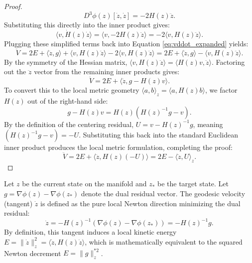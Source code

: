 \begin{proof}
\begin{equation}
    D^3\phi(z)[\dot{z}, \dot{z}] = -2H(z)\ddot{z}.
\end{equation}
Substituting this directly into the inner product gives:
\begin{equation}
    \langle v, \dot{H}(z)\dot{z} \rangle = \langle v, -2H(z)\ddot{z} \rangle = -2\langle v, H(z)\ddot{z} \rangle.
\end{equation}
Plugging these simplified terms back into Equation \ref{eq:vddot_expanded} yields:
\begin{equation}
    \ddot{V} = 2E + \langle \ddot{z}, g \rangle + \langle v, H(z)\ddot{z} \rangle - 2\langle v, H(z)\ddot{z} \rangle = 2E + \langle \ddot{z}, g \rangle - \langle v, H(z)\ddot{z} \rangle.
\end{equation}
By the symmetry of the Hessian matrix, $\langle v, H(z)\ddot{z} \rangle = \langle H(z)v, \ddot{z} \rangle$. Factoring out the $\ddot{z}$ vector from the remaining inner products gives:
\begin{equation}
    \ddot{V} = 2E + \langle \ddot{z}, g - H(z)v \rangle.
\end{equation}
To convert this to the local metric geometry $\langle a, b \rangle_z = \langle a, H(z)b \rangle$, we factor $H(z)$ out of the right-hand side:
\begin{equation}
    g - H(z)v = H(z)(H(z)^{-1}g - v).
\end{equation}
By the definition of the centering residual, $U = v - H(z)^{-1}g$, meaning $(H(z)^{-1}g - v) = -U$. Substituting this back into the standard Euclidean inner product produces the local metric formulation, completing the proof:
\begin{equation}
    \ddot{V} = 2E + \langle \ddot{z}, H(z)(-U) \rangle = 2E - \langle \ddot{z}, U \rangle_z.
\end{equation}
\end{proof}



\begin{definition}
\label{def:newton_tangent}
Let $z$ be the current state on the manifold and $z_*$ be the target state. Let $g = \nabla \phi(z) - \nabla \phi(z_*)$ denote the dual residual vector. The geodesic velocity (tangent) $\dot{z}$ is defined as the pure local Newton direction minimizing the dual residual:
\begin{equation}
    \dot{z} = -H(z)^{-1} (\nabla \phi(z) - \nabla \phi(z_*)) = -H(z)^{-1}g.
\end{equation}
By definition, this tangent induces a local kinetic energy $E = \|\dot{z}\|_z^2 = \langle \dot{z}, H(z)\dot{z} \rangle$, which is mathematically equivalent to the squared Newton decrement $E = \|g\|_z^{*2}$.
\end{definition}

